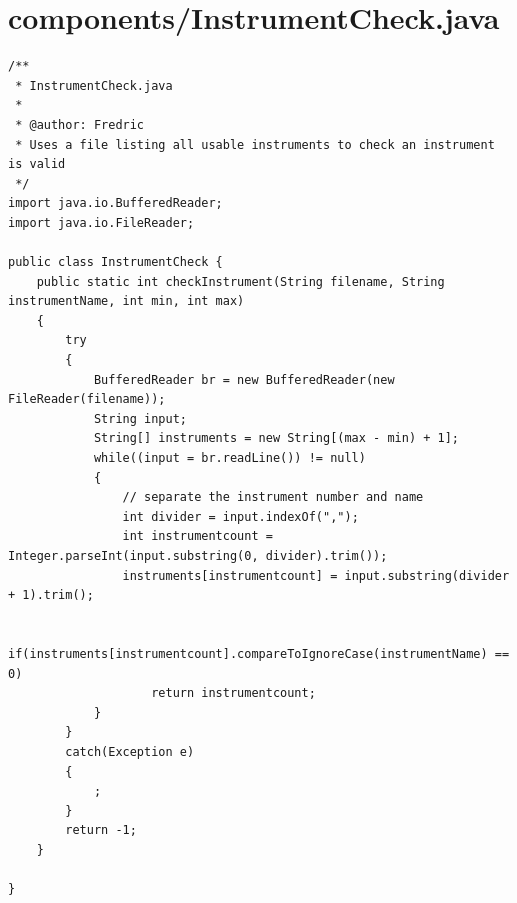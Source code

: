 \documentclass[12pt,A4]{book}
\begin{document}
\section{components/InstrumentCheck.java}
\begin{verbatim}
/**
 * InstrumentCheck.java
 * 
 * @author: Fredric
 * Uses a file listing all usable instruments to check an instrument is valid
 */
import java.io.BufferedReader;
import java.io.FileReader;

public class InstrumentCheck {
	public static int checkInstrument(String filename, String instrumentName, int min, int max)
	{
		try
		{
			BufferedReader br = new BufferedReader(new FileReader(filename));
			String input;
			String[] instruments = new String[(max - min) + 1];
			while((input = br.readLine()) != null)
			{
				// separate the instrument number and name
				int divider = input.indexOf(",");
				int instrumentcount = Integer.parseInt(input.substring(0, divider).trim());
				instruments[instrumentcount] = input.substring(divider + 1).trim();
				
				if(instruments[instrumentcount].compareToIgnoreCase(instrumentName) == 0)
					return instrumentcount;
			}
		}
		catch(Exception e)
		{
			;
		}
		return -1;
	}

}
\end{verbatim}
\end{document}
